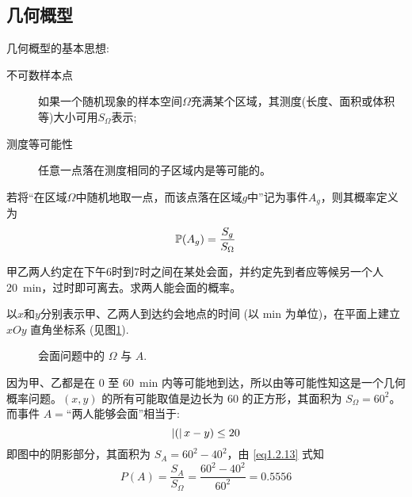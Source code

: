 \subsection{几何概型}

几何概型的基本思想:
\begin{description}
    \item[不可数样本点] 如果一个随机现象的样本空间$\Omega$充满某个区域，其测度(长度、面积或体积等)大小可用$S_\Omega$表示;
    \item[测度等可能性] 任意一点落在测度相同的子区域内是等可能的。
\end{description}

\begin{definition}[几何概型]
    若将“在区域$\Omega$中随机地取一点，而该点落在区域$g$中”记为事件$A_g$，则其概率定义为
    \[ \P(A_g) = \frac{S_g}{S_\Omega}\]
\end{definition}

\begin{example}[会商问题]
    甲乙两人约定在下午6时到7时之间在某处会面，并约定先到者应等候另一个人\SI{20}{\minute}，过时即可离去。求两人能会面的概率。
\end{example}
\begin{solution}
    以$x$和$y$分别表示甲、乙两人到达约会地点的时间 (以 \si{\minute} 为单位)，在平面上建立 $xOy$ 直角坐标系 (见图\ref{fig:meeting_problem}).
    \begin{figure}[!ht]
        \centering
        \caption{会面问题中的 $\Omega$ 与 $A$.}
        \label{fig:meeting_problem}
    \end{figure}
    因为甲、乙都是在 0 至 \SI{60}{\minute} 内等可能地到达，所以由等可能性知这是一个几何概率问题。$(x, y)$ 的所有可能取值是边长为 60 的正方形，其面积为 $S_\Omega = 60^2$。而事件 $A =$“两人能够会面”相当于:
    \[ \abs(x - y) \le 20 \]
    即图中的阴影部分，其面积为 $S_A = 60^2 - 40^2$，由 \eqref{eq1.2.13} 式知
    \[ P (A) = \frac{S_A}{S_\Omega} = \frac{60^2 - 40^2}{60^2} = 0.5556 \]
\end{solution}

